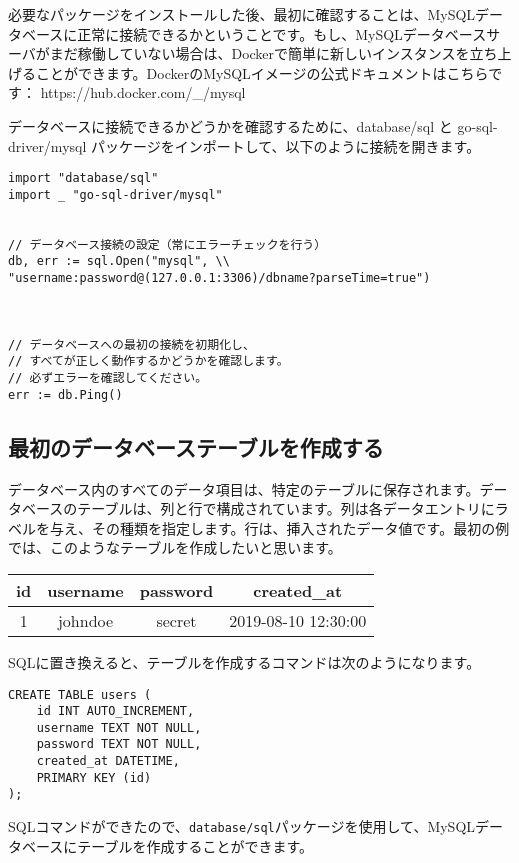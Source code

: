 必要なパッケージをインストールした後、最初に確認することは、MySQLデータベースに正常に接続できるかということです。もし、MySQLデータベースサーバがまだ稼働していない場合は、Dockerで簡単に新しいインスタンスを立ち上げることができます。DockerのMySQLイメージの公式ドキュメントはこちらです： https://hub.docker.com/\_/mysql

データベースに接続できるかどうかを確認するために、database/sql と go-sql-driver/mysql パッケージをインポートして、以下のように接続を開きます。


\begin{lstlisting}[numbers=none]
import "database/sql"
import _ "go-sql-driver/mysql"


// データベース接続の設定（常にエラーチェックを行う）
db, err := sql.Open("mysql", \\
"username:password@(127.0.0.1:3306)/dbname?parseTime=true")



// データベースへの最初の接続を初期化し、
// すべてが正しく動作するかどうかを確認します。
// 必ずエラーを確認してください。
err := db.Ping()
\end{lstlisting}


\subsection{最初のデータベーステーブルを作成する}

データベース内のすべてのデータ項目は、特定のテーブルに保存されます。データベースのテーブルは、列と行で構成されています。列は各データエントリにラベルを与え、その種類を指定します。行は、挿入されたデータ値です。最初の例では、このようなテーブルを作成したいと思います。

\begin{tabular}{|c|c|c|c|}\hline
    id & username & password & created\_at\\ \hline
    1 & johndoe & secret & 2019-08-10 12:30:00\\ \hline
\end{tabular}

SQLに置き換えると、テーブルを作成するコマンドは次のようになります。


\begin{lstlisting}[numbers=none]
CREATE TABLE users (
    id INT AUTO_INCREMENT,
    username TEXT NOT NULL,
    password TEXT NOT NULL,
    created_at DATETIME,
    PRIMARY KEY (id)
);
\end{lstlisting}

SQLコマンドができたので、\texttt{database/sql}パッケージを使用して、MySQLデータベースにテーブルを作成することができます。


